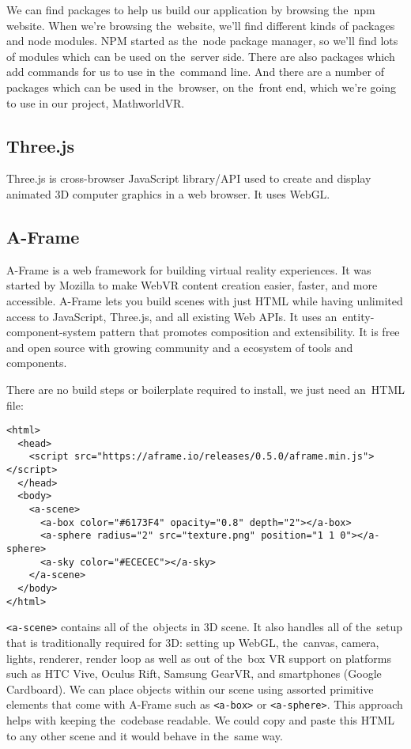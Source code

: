 We can find packages to help us build our application by browsing the~npm website. When we're browsing the~website, we'll find different kinds of packages and node modules. NPM started as the~node package manager, so we'll find lots of modules which can be used on the~server side. There are also packages which add commands for us to use in the~command line.\cite{npm} And there are a number of packages which can be used in the~browser, on the~front end, which we're going to use in our project, MathworldVR.

\subsection{Three.js}
Three.js is cross-browser JavaScript library/API used to create and display animated 3D computer graphics in a web browser. It uses WebGL.

\subsection{A-Frame}
A-Frame is a web framework for building virtual reality experiences. It was started by Mozilla to make WebVR content creation easier, faster, and more accessible. A-Frame lets you build scenes with just HTML while having unlimited access to JavaScript, Three.js, and all existing Web APIs. It uses an~entity-component-system pattern that promotes composition and extensibility. It is free and open source with growing community and a ecosystem of tools and components. \cite{aframe-intro}

There are no build steps or boilerplate required to install, we just need an~HTML file:

\begin{lstlisting}
<html>
  <head>
    <script src="https://aframe.io/releases/0.5.0/aframe.min.js"></script>
  </head>
  <body>
    <a-scene>
      <a-box color="#6173F4" opacity="0.8" depth="2"></a-box>
      <a-sphere radius="2" src="texture.png" position="1 1 0"></a-sphere>
      <a-sky color="#ECECEC"></a-sky>
    </a-scene>
  </body>
</html>
\end{lstlisting}

\texttt{<a-scene>} contains all of the~objects in 3D scene. It also handles all of the~setup that is traditionally required for 3D: setting up WebGL, the~canvas, camera, lights, renderer, render loop as well as out of the~box VR support on platforms such as HTC Vive, Oculus Rift, Samsung GearVR, and smartphones (Google Cardboard). We can place objects within our scene using assorted primitive elements that come with A-Frame such as \texttt{<a-box>} or \texttt{<a-sphere>}. This approach helps with keeping the~codebase readable. We could copy and paste this HTML to any other scene and it would behave in the~same way. \cite{aframe-intro}

